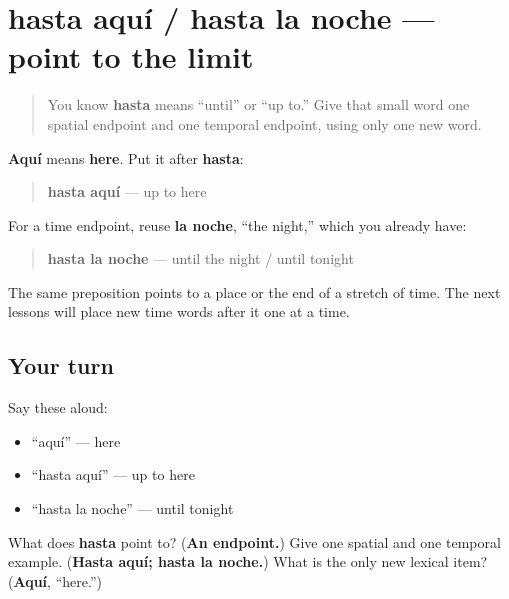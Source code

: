 \section[hasta aquí / hasta la noche]{hasta aquí / hasta la noche — point to the limit}

\label{lesson:ES-C05-hasta-limits}



\begin{quote}
You know \textbf{hasta} means “until” or “up to.” Give that small word one spatial endpoint and one temporal endpoint, using only one new word.
\end{quote}

\begin{grammarlens}[title={Grammar Lens: endpoints in space and time}]
\textbf{Aquí} means \textbf{here}. Put it after \textbf{hasta}:

\begin{quote}
\textbf{hasta aquí} — up to here
\end{quote}

For a time endpoint, reuse \textbf{la noche}, “the night,” which you already have:

\begin{quote}
\textbf{hasta la noche} — until the night / until tonight
\end{quote}

The same preposition points to a place or the end of a stretch of time. The next lessons will place new time words after it one at a time.
\end{grammarlens}

\subsection*{Your turn}
Say these aloud:

\begin{itemize}
\raggedright
  \item “aquí” — here
  \item “hasta aquí” — up to here
  \item “hasta la noche” — until tonight
\end{itemize}

\begin{tcolorbox}[breakable,colback=teal!4,colframe=teal!35!black,title={Before you move on}]
What does \textbf{hasta} point to? (\textbf{An endpoint.}) Give one spatial and one temporal example. (\textbf{Hasta aquí; hasta la noche.}) What is the only new lexical item? (\textbf{Aquí}, “here.”)
\end{tcolorbox}

